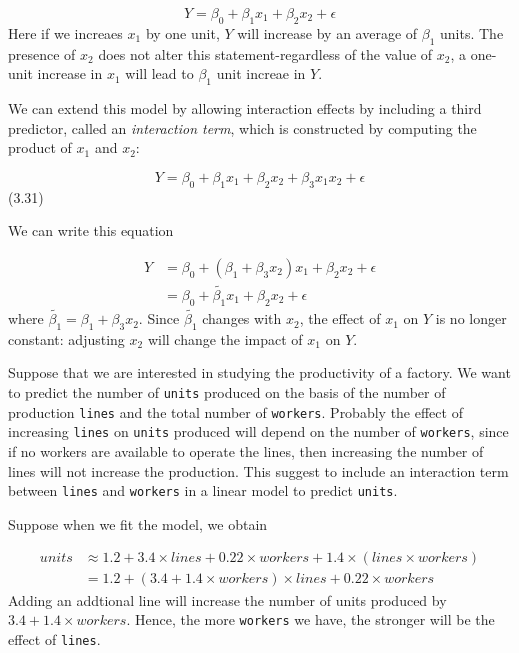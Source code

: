\documentclass[
  letterpaper,
  DIV=11,
  numbers=noendperiod]{scrreprt}
\begin{document}
\[
Y = \beta_0 + \beta_1x_1 + \beta_2x_2 + \epsilon
\] Here if we increaes \(x_1\) by one unit, \(Y\) will increase by an
average of \(\beta_1\) units. The presence of \(x_2\) does not alter
this statement-regardless of the value of \(x_2\), a one-unit increase
in \(x_1\) will lead to \(\beta_1\) unit increae in \(Y\).

We can extend this model by allowing interaction effects by including a
third predictor, called an \emph{interaction term}, which is constructed
by computing the product of \(x_1\) and \(x_2\):

\[
Y = \beta_0 + \beta_1 x_1 + \beta_2 x_2 + \beta_3 x_1 x_2 + \epsilon
\] (3.31)

We can write this equation

\[
\begin{align}
Y &= \beta_0 + (\beta_1 + \beta_3 x_2)x_1 + \beta_2x_2 +\epsilon \\
&= \beta_0 + \tilde{\beta_1}x_1 + \beta_2x_2 + \epsilon
\end{align}
\] where \(\tilde{\beta_1} = \beta_1 + \beta_3x_2\). Since
\(\tilde{\beta_1}\) changes with \(x_2\), the effect of \(x_1\) on \(Y\)
is no longer constant: adjusting \(x_2\) will change the impact of
\(x_1\) on \(Y\).

\begin{tcolorbox}[enhanced jigsaw, colframe=quarto-callout-note-color-frame, opacityback=0, toptitle=1mm, toprule=.15mm, rightrule=.15mm, bottomtitle=1mm, titlerule=0mm, title=\textcolor{quarto-callout-note-color}{\faInfo}\hspace{0.5em}{Productivy of a factory}, colbacktitle=quarto-callout-note-color!10!white, arc=.35mm, breakable, leftrule=.75mm, coltitle=black, bottomrule=.15mm, opacitybacktitle=0.6, left=2mm, colback=white]

Suppose that we are interested in studying the productivity of a
factory. We want to predict the number of \texttt{units} produced on the
basis of the number of production \texttt{lines} and the total number of
\texttt{workers}. Probably the effect of increasing \texttt{lines} on
\texttt{units} produced will depend on the number of \texttt{workers},
since if no workers are available to operate the lines, then increasing
the number of lines will not increase the production. This suggest to
include an interaction term between \texttt{lines} and \texttt{workers}
in a linear model to predict \texttt{units}.

Suppose when we fit the model, we obtain

\[
\begin{align}
units &\approx 1.2 + 3.4 \times lines + 0.22 \times workers + 1.4 \times (lines \times workers) \\
&= 1.2 + (3.4 + 1.4 \times workers) \times lines + 0.22 \times workers
\end{align}
\] Adding an addtional line will increase the number of units produced
by \(3.4 + 1.4 \times workers\). Hence, the more \texttt{workers} we
have, the stronger will be the effect of \texttt{lines}.

\end{tcolorbox}
\end{document}
